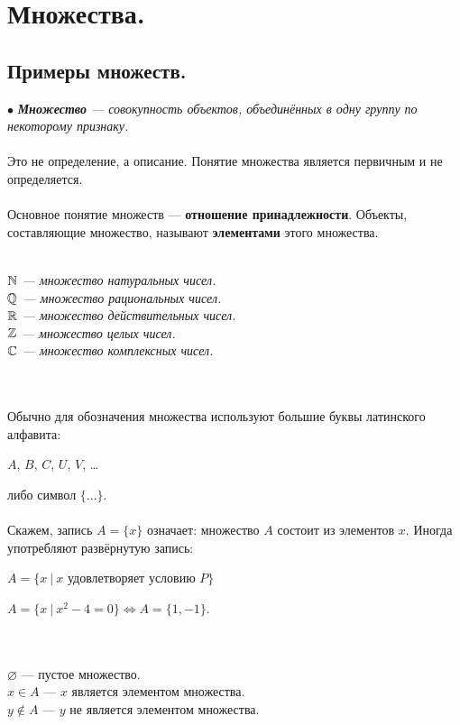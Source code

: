 	\chapter{Множества.}
\section{Примеры множеств.}
$\bullet$ \textit{\textbf{Множество} --- совокупность объектов, объединённых в одну группу по некоторому признаку.}\\\\
Это не определение, а описание. Понятие множества является первичным и не определяется.\\\\
Основное понятие множеств --- \textbf{отношение принадлежности}. Объекты, составляющие множество, называют \textbf{элементами} этого множества.\\
\begin{example}\\
	\textit{$\mathbb{N}$ --- множество натуральных чисел.\\
		$\mathbb{Q}$ --- множество рациональных чисел.\\
		$\mathbb{R}$ --- множество действительных чисел.\\
		$\mathbb{Z}$ --- множество целых чисел.\\
		$\mathbb{C}$ --- множество комплексных чисел.}
\end{example}\\\\
Обычно для обозначения множества используют большие буквы латинского алфавита:
\begin{center}
	$A$, $B$, $C$, $U$, $V$, \dots
\end{center}
либо символ $\{\dots\}$.\\\\
Скажем, запись $A=\{x\}$ означает: множество $A$ состоит из элементов $x$. Иногда употребляют развёрнутую запись:
\begin{center}
	$A=\{x\:|\: x$ удовлетворяет условию $P\}$
\end{center}
\begin{example}
	$A=\{x\:|\: x^2-4=0\} \Leftrightarrow A=\{1, -1\}$.
\end{example}\\\\
$\varnothing$ --- пустое множество.\\
$x \in A$ --- $x$ является элементом множества.\\
$y \notin A$ --- $y$ не является элементом множества.\\\\
